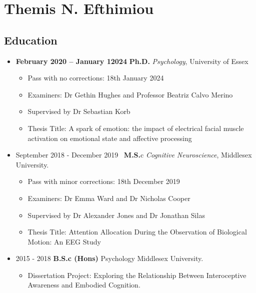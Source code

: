 \documentclass[
  letterpaper,
  DIV=11,
  numbers=noendperiod]{scrartcl}
\author{}
\date{}
\providecommand{\tightlist}{%
  \setlength{\itemsep}{0pt}\setlength{\parskip}{0pt}}\usepackage{longtable,booktabs,array}
\begin{document}
\pagestyle{mystyle}


\section{Themis N. Efthimiou}\label{themis-n.-efthimiou}

\subsection{\texorpdfstring{ Education}{ Education}}\label{education}

\begin{itemize}
\item
  \textbf{February 2020 -- January 12024} \textbar{} \textbf{Ph.D.}
  \emph{Psychology}, University of Essex

  \begin{itemize}
  \item
    Pass with no corrections: 18th January 2024~
  \item
    Examiners: Dr Gethin Hughes and Professor Beatriz Calvo Merino~
  \item
    Supervised by Dr Sebastian Korb ~
  \item
    Thesis Title: A spark of emotion: the impact of electrical facial
    muscle activation on emotional state and affective processing
  \end{itemize}
\item
  September 2018 - December 2019~\textbar{} \textbf{M.S.}c
  \emph{Cognitive Neuroscience}, Middlesex University.

  \begin{itemize}
  \item
    Pass with minor corrections: 18th December 2019~
  \item
    Examiners: Dr Emma Ward and Dr Nicholas Cooper~
  \item
    Supervised by Dr Alexander Jones and Dr Jonathan Silas~
  \item
    Thesis Title: Attention Allocation During the Observation of
    Biological Motion: An EEG Study
  \end{itemize}
\item
  2015 - 2018 \textbar{} \textbf{B.S.c (Hons)} Psychology \textbar{}
  Middlesex University.

  \begin{itemize}
  \tightlist
  \item
    Dissertation Project: Exploring the Relationship Between
    Interoceptive Awareness and Embodied Cognition.
  \end{itemize}
\end{itemize}
\end{document}

